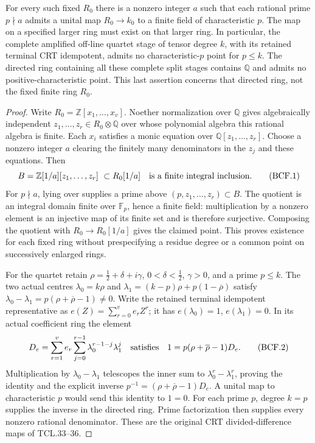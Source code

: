 \begin{proposition}
\label{BC:prop:coefficient-primes}
For every such fixed \(R_0\) there is a nonzero integer \(a\)
such that each rational prime \(p\nmid a\) admits a unital map
\(R_0\to k_0\) to a finite field of characteristic \(p\).
The map on a specified larger ring must exist on that larger ring.
In particular, the complete amplified off-line quartet stage of
tensor degree \(k\), with its retained terminal CRT idempotent,
admits no characteristic-\(p\) point for \(p\leq k\).
The directed ring containing all these complete split stages
contains \(\mathbb Q\) and admits no positive-characteristic point.
This last assertion concerns that directed ring, not the fixed
finite ring \(R_0\).
\end{proposition}
\begin{proof}
Write \(R_0=\mathbb Z[x_1,\ldots,x_v]\).
Noether normalization over \(\mathbb Q\) gives algebraically
independent \(z_1,\ldots,z_r\in R_0\otimes\mathbb Q\)
over whose polynomial algebra this rational algebra is finite.
Each \(x_i\) satisfies a monic equation over
\(\mathbb Q[z_1,\ldots,z_r]\).  Choose a nonzero integer
\(a\) clearing the finitely many denominators in the \(z_j\)
and these equations.  Then
\[
 B=\mathbb Z[1/a][z_1,\ldots,z_r]\ \subset R_0[1/a]
 \quad\hbox{is a finite integral inclusion}.
 \tag{BCF.1}\label{BC:eq:finite-stage-integral}
\]
For \(p\nmid a\), lying over supplies a prime above
\((p,z_1,\ldots,z_r)\subset B\).  The quotient is an
integral domain finite over \(\mathbb F_p\), hence a finite
field: multiplication by a nonzero element is an injective map
of its finite set and is therefore surjective.  Composing the
quotient with \(R_0\to R_0[1/a]\) gives the claimed point.
This proves existence for each fixed ring without prespecifying
a residue degree or a common point on successively enlarged rings.

For the quartet retain
\(\rho=\tfrac12+\delta+i\gamma\), \(0<\delta<\tfrac12\),
\(\gamma>0\), and a prime \(p\leq k\).  The two actual
centres
\(\lambda_0=k\rho\) and
\(\lambda_1=(k-p)\rho+p(1-\overline\rho)\)
satisfy
\(\lambda_0-\lambda_1=p(\rho+\overline\rho-1)\ne0\).
Write the retained terminal idempotent representative as
\(e(Z)=\sum_{r=0}^{v}e_rZ^r\); it has
\(e(\lambda_0)=1\), \(e(\lambda_1)=0\).  In its actual
coefficient ring the element
\[
 D_e=\sum_{r=1}^{v}e_r\sum_{j=0}^{r-1}
                  \lambda_0^{r-1-j}\lambda_1^j
 \quad\hbox{satisfies}\quad
 1=p(\rho+\overline\rho-1)D_e .
 \tag{BCF.2}\label{BC:eq:crt-prime-inverse}
\]
Multiplication by \(\lambda_0-\lambda_1\) telescopes the
inner sum to \(\lambda_0^r-\lambda_1^r\), proving the
identity and the explicit inverse
\(p^{-1}=(\rho+\overline\rho-1)D_e\).
A unital map to characteristic \(p\) would send this identity
to \(1=0\).  For each prime \(p\), degree \(k=p\)
supplies the inverse in the directed ring.  Prime factorization
then supplies every nonzero rational denominator.  These are
the original CRT divided-difference maps of TCL.33--36.
\end{proof}

